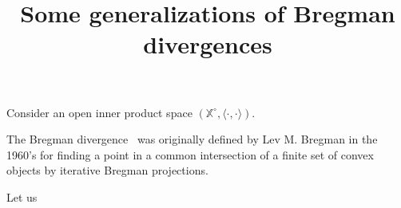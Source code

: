 \documentclass{article}
\title{Some generalizations of Bregman divergences}
\def\bbX{\mathbb{X}}
\def\inner#1#2{{\langle #1, #2\rangle}}
\begin{document}
\maketitle

Consider an open inner product space $(\bbX^\circ,\inner{\cdot}{\cdot})$.


The Bregman divergence~\cite{Bregman-1967} was originally defined by Lev M. Bregman in the 1960's for finding a point in a common intersection of a finite set of convex objects by iterative Bregman projections.


Let us 
\end{document}

